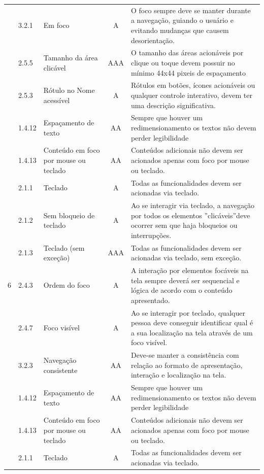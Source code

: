 {{\begin{minipage}{\linewidth}
{\begin{tabular}{|c|l|l|c|p{400px}|}
        \cline{2-5} & 3.2.1 & Em foco & A & O foco sempre deve se manter durante a navegação, guiando o usuário e evitando mudanças que causem desorientação.\\
        \cline{2-5} & 2.5.5 & Tamanho da área clicável & AAA & O tamanho das áreas acionáveis por clique ou toque devem possuir no mínimo 44x44 pixeis de espaçamento\\
        \cline{2-5} & 2.5.3 & Rótulo no Nome acessível & A & Rótulos em botões, ícones acionáveis ou qualquer controle interativo, devem ter uma descrição significativa.\\
        \cline{2-5} & 1.4.12 & Espaçamento de texto & AA & Sempre que houver um redimensionamento os textos não devem perder legibilidade\\
        \cline{2-5} & 1.4.13 & Conteúdo em foco por mouse ou teclado & AA & Conteúdos adicionais não devem ser acionados apenas com foco por mouse ou teclado.\\
        \cline{2-5} & 2.1.1 & Teclado & A & Todas as funcionalidades devem ser acionadas via teclado. \\
        \cline{2-5} & 2.1.2 & Sem bloqueio de teclado & A & Ao se interagir via teclado, a navegação por todos os elementos ”clicáveis”deve ocorrer sem que haja bloqueios ou interrupções.\\
        \cline{2-5} & 2.1.3 & Teclado (sem exceção) & AAA & Todas as funcionalidades devem ser acionadas via teclado, sem exceção.\\
    \hline 
    6 & 2.4.3 & 
        Ordem do foco & A & A interação por elementos focáveis na tela sempre deverá ser sequencial e lógica de acordo com o conteúdo apresentado.\\
        \cline{2-5} & 2.4.7 & Foco visível & A & Ao se interagir por teclado, qualquer pessoa deve conseguir identificar qual é a sua localização na tela através de um foco visível. \\
        \cline{2-5} & 3.2.3 & Navegação consistente & AA & Deve-se manter a consistência com relação ao formato de apresentação, interação e localização na tela. \\
        \cline{2-5} & 1.4.12 & Espaçamento de texto & AA & Sempre que houver um redimensionamento os textos não devem perder legibilidade\\
        \cline{2-5} & 1.4.13 & Conteúdo em foco por mouse ou teclado & AA & Conteúdos adicionais não devem ser acionados apenas com foco por mouse ou teclado.\\
        \cline{2-5} & 2.1.1 & Teclado & A & Todas as funcionalidades devem ser acionadas via teclado. \\

\end{tabular}}
\end{minipage}}}
